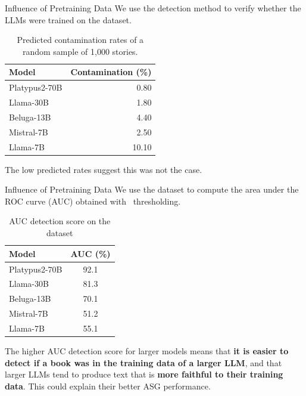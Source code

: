 \begin{frame}{Influence of Pretraining Data}
    We use the {\minkprob} detection method to verify whether the LLMs were trained on the {\wpfan} dataset.
    \begin{table}[h]
        \centering
        \begin{tabular}{lr}
        \toprule
        \textbf{Model} & \textbf{Contamination (\%)} \\
        \midrule
        Platypus2-70B & 0.80 \\
        Llama-30B & 1.80 \\
        Beluga-13B & 4.40\\
        Mistral-7B & 2.50 \\
        Llama-7B & 10.10\\
        \bottomrule
        \end{tabular}
        \caption{Predicted contamination rates of a random {\wpfan} sample of 1,000 stories.}
        \label{tab:wp_contamination}
    \end{table}
    \vspace*{-0.4cm}
    The low predicted rates suggest this was not the case.
\end{frame}

\begin{frame}{Influence of Pretraining Data}
    We use the {\booksmia} dataset to compute the area under the ROC curve (AUC) obtained with \minkprob\ thresholding.
    \begin{table}[h]
        \scriptsize
        \centering
        \begin{tabular}{lc}
        \toprule
        \textbf{Model} & \textbf{AUC (\%)} \\
        \midrule
        Platypus2-70B & 92.1 \\
        Llama-30B & 81.3 \\
        Beluga-13B & 70.1\\
        Mistral-7B & 51.2 \\
        Llama-7B & 55.1 \\
        \bottomrule
        \end{tabular}
        \caption{AUC detection score on the {\booksmia} dataset}
        \label{tab:book_auc}
    \end{table}
    \vspace*{-0.3cm}
    The higher AUC detection score for larger models means that \textbf{it is easier to detect if a book was in the training data of a larger LLM}, and that larger LLMs tend to produce text that is \textbf{more faithful to their training data}. This could explain their better ASG performance.
\end{frame}

